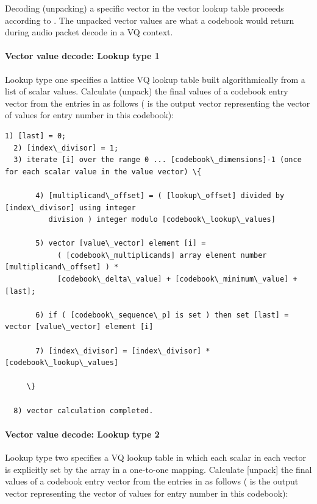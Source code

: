 \bigskip

Decoding (unpacking) a specific vector in the vector lookup table
proceeds according to .  The unpacked
vector values are what a codebook would return during audio packet
decode in a VQ context.

\paragraph{Vector value decode: Lookup type 1}

Lookup type one specifies a lattice VQ lookup table built
algorithmically from a list of scalar values.  Calculate (unpack) the
final values of a codebook entry vector from the entries in
 as follows (
is the output vector representing the vector of values for entry number
 in this codebook):

\begin{Verbatim}[commandchars=\\\{\}]
  1) [last] = 0;
  2) [index\_divisor] = 1;
  3) iterate [i] over the range 0 ... [codebook\_dimensions]-1 (once for each scalar value in the value vector) \{

       4) [multiplicand\_offset] = ( [lookup\_offset] divided by [index\_divisor] using integer
          division ) integer modulo [codebook\_lookup\_values]

       5) vector [value\_vector] element [i] =
            ( [codebook\_multiplicands] array element number [multiplicand\_offset] ) *
            [codebook\_delta\_value] + [codebook\_minimum\_value] + [last];

       6) if ( [codebook\_sequence\_p] is set ) then set [last] = vector [value\_vector] element [i]

       7) [index\_divisor] = [index\_divisor] * [codebook\_lookup\_values]

     \}

  8) vector calculation completed.
\end{Verbatim}



\paragraph{Vector value decode: Lookup type 2}

Lookup type two specifies a VQ lookup table in which each scalar in
each vector is explicitly set by the 
array in a one-to-one mapping.  Calculate [unpack] the
final values of a codebook entry vector from the entries in
 as follows (
is the output vector representing the vector of values for entry number
 in this codebook):

